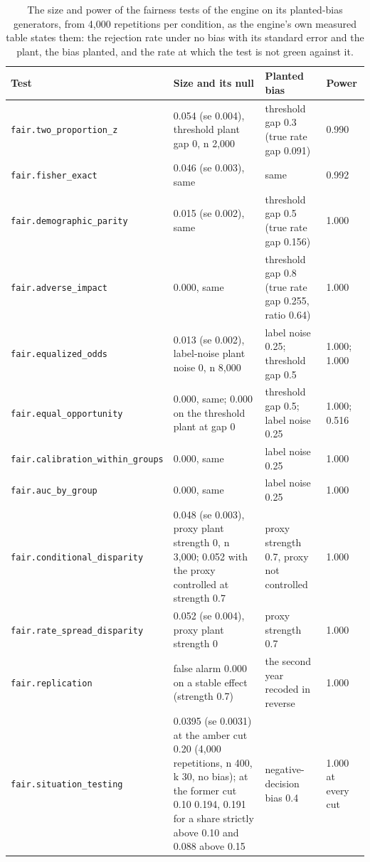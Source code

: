 \begin{table}[htbp]
\centering
\setlength{\tabcolsep}{3pt}
\footnotesize
\caption{The size and power of the fairness tests of the engine on its planted-bias generators, from 4,000 repetitions per condition, as the engine's own measured table states them: the rejection rate under no bias with its standard error and the plant, the bias planted, and the rate at which the test is not green against it.}
\label{tab:vt-fair-size}
\begin{tabular}{p{3.4cm}p{4.8cm}p{3.6cm}p{1.8cm}}
\toprule
Test & Size and its null & Planted bias & Power \\
\midrule
\nolinkurl{fair.two_proportion_z} & 0.054 (se 0.004), threshold plant gap 0, n 2,000 & threshold gap 0.3 (true rate gap 0.091) & 0.990 \\
\nolinkurl{fair.fisher_exact} & 0.046 (se 0.003), same & same & 0.992 \\
\nolinkurl{fair.demographic_parity} & 0.015 (se 0.002), same & threshold gap 0.5 (true rate gap 0.156) & 1.000 \\
\nolinkurl{fair.adverse_impact} & 0.000, same & threshold gap 0.8 (true rate gap 0.255, ratio 0.64) & 1.000 \\
\nolinkurl{fair.equalized_odds} & 0.013 (se 0.002), label-noise plant noise 0, n 8,000 & label noise 0.25; threshold gap 0.5 & 1.000; 1.000 \\
\nolinkurl{fair.equal_opportunity} & 0.000, same; 0.000 on the threshold plant at gap 0 & threshold gap 0.5; label noise 0.25 & 1.000; 0.516 \\
\nolinkurl{fair.calibration_within_groups} & 0.000, same & label noise 0.25 & 1.000 \\
\nolinkurl{fair.auc_by_group} & 0.000, same & label noise 0.25 & 1.000 \\
\nolinkurl{fair.conditional_disparity} & 0.048 (se 0.003), proxy plant strength 0, n 3,000; 0.052 with the proxy controlled at strength 0.7 & proxy strength 0.7, proxy not controlled & 1.000 \\
\nolinkurl{fair.rate_spread_disparity} & 0.052 (se 0.004), proxy plant strength 0 & proxy strength 0.7 & 1.000 \\
\nolinkurl{fair.replication} & false alarm 0.000 on a stable effect (strength 0.7) & the second year recoded in reverse & 1.000 \\
\nolinkurl{fair.situation_testing} & 0.0395 (se 0.0031) at the amber cut 0.20 (4,000 repetitions, n 400, k 30, no bias); at the former cut 0.10 0.194, 0.191 for a share strictly above 0.10 and 0.088 above 0.15 & negative-decision bias 0.4 & 1.000 at every cut \\
\bottomrule
\end{tabular}
\end{table}
